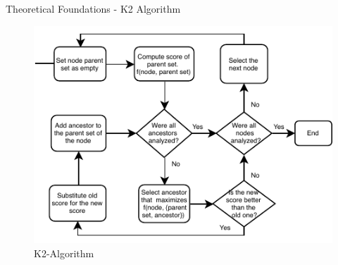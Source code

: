 \begin{frame}{Theoretical Foundations - K2 Algorithm}

\begin{figure}[!h]
            \centering
            \includegraphics{figuras/k2.pdf}
            \caption{K2-Algorithm}
            \label{fig:k2}
        \end{figure}
  
\end{frame}





